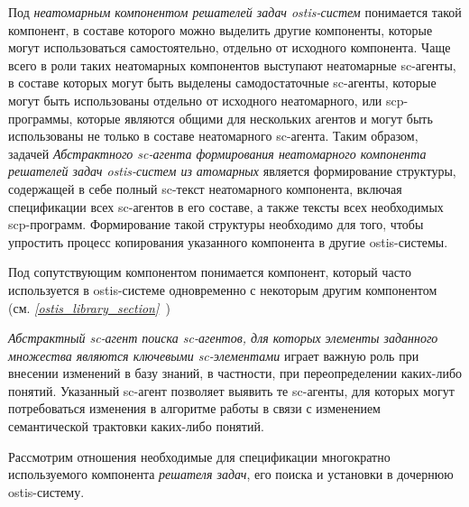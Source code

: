 Под \textit{неатомарным компонентом решателей задач ostis-систем} понимается такой компонент, в составе которого можно выделить другие компоненты, которые могут использоваться самостоятельно, отдельно от исходного компонента. Чаще всего в роли таких неатомарных компонентов выступают неатомарные sc-агенты, в составе которых могут быть выделены самодостаточные sc-агенты, которые могут быть использованы отдельно от исходного неатомарного, или scp-программы, которые являются общими для нескольких агентов и могут быть использованы не только в составе неатомарного sc-агента. Таким образом, задачей \textit{Абстрактного sc-агента формирования неатомарного компонента решателей задач ostis-систем из атомарных} является формирование структуры, содержащей в себе полный sc-текст неатомарного компонента, включая спецификации всех \mbox{sc-агентов} в его составе, а также тексты всех необходимых scp-программ. Формирование такой структуры необходимо для того, чтобы упростить процесс копирования указанного компонента в другие ostis-системы.

Под сопутствующим компонентом понимается компонент, который часто используется в ostis-системе одновременно с некоторым другим компонентом (см. \textit{\ref{ostis_library_section}~})

\textit{Абстрактный sc-агент поиска sc-агентов, для которых элементы заданного множества являются ключевыми sc-элементами} играет важную роль при внесении изменений в базу знаний, в частности, при переопределении каких-либо понятий. Указанный sc-агент позволяет выявить те sc-агенты, для которых могут потребоваться изменения в алгоритме работы в связи с изменением семантической трактовки каких-либо понятий.

Рассмотрим отношения необходимые для спецификации многократно используемого компонента \textit{решателя задач}, его поиска и установки в дочернюю ostis-систему.

